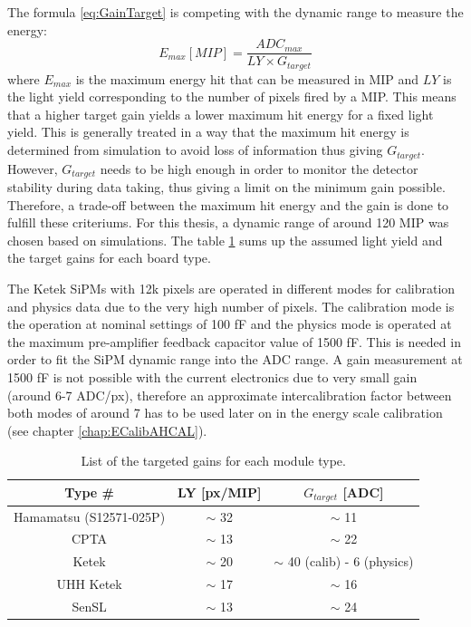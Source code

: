 The formula \ref{eq:GainTarget} is competing with the dynamic range to measure the energy:
\begin{equation}
  E_{max} [MIP] = \frac{ADC_{max}}{LY \times G_{target}}
\end{equation}
where $E_{max}$ is the maximum energy hit that can be measured in MIP and $LY$ is the light yield corresponding to the number of pixels fired by a MIP. This means that a higher target gain yields a lower maximum hit energy for a fixed light yield. This is generally treated in a way that the maximum hit energy is determined from simulation to avoid loss of information thus giving $G_{target}$. However, $G_{target}$ needs to be high enough in order to monitor the detector stability during data taking, thus giving a limit on the minimum gain possible. Therefore, a trade-off between the maximum hit energy and the gain is done to fulfill these criteriums. For this thesis, a dynamic range of around 120 MIP was chosen based on simulations. The table \ref{table:GainTarget_SiPM} sums up the assumed light yield and the target gains for each board type.

The Ketek SiPMs with 12k pixels are operated in different modes for calibration and physics data due to the very high number of pixels. The calibration mode is the operation at nominal settings of 100 fF and the physics mode is operated at the maximum pre-amplifier feedback capacitor value of 1500 fF. This is needed in order to fit the SiPM dynamic range into the ADC range. A gain measurement at 1500 fF is not possible with the current electronics due to very small gain (around 6-7 ADC/px), therefore an approximate intercalibration factor between both modes of around 7 has to be used later on in the energy scale calibration (see chapter \ref{chap:ECalibAHCAL}).

\begin{table}[htb!]
  \centering
  \caption{List of the targeted gains for each module type.}
  \label{table:GainTarget_SiPM}
  \begin{tabular}{@{} ccc @{}}
    \toprule
    Type \# & LY [px/MIP] & $G_{target}$ [ADC] \\
    \midrule
    Hamamatsu (S12571-025P) & $\sim$ 32 & $\sim$ 11\\
    CPTA & $\sim$ 13 & $\sim$ 22\\
    Ketek & $\sim$ 20 & $\sim$ 40 (calib) - 6 (physics)\\
    UHH Ketek & $\sim$ 17 & $\sim$ 16\\
    SenSL & $\sim$ 13 & $\sim$ 24\\
    \bottomrule
  \end{tabular}
\end{table}

